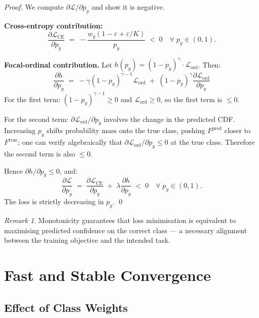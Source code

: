 \documentclass[12pt, a4paper]{article}
\theoremstyle{definition}
\theoremstyle{remark}
\newtheorem{remark}{Remark}
\begin{document}
\begin{proof}
We compute $\partial \mathcal{L}/\partial p_y$ and show it is negative.

\textbf{Cross-entropy contribution:}
\[
    \frac{\partial \mathcal{L}_{\mathrm{CE}}}{\partial p_y}
    \;=\; -\frac{w_y(1-\varepsilon+\varepsilon/K)}{p_y} \;<\; 0
    \quad \forall\; p_y \in (0,1).
\]

\textbf{Focal-ordinal contribution.}
Let $h(p_y) = (1-p_y)^\gamma \cdot \mathcal{L}_{\mathrm{ord}}$. Then:
\[
    \frac{\partial h}{\partial p_y}
    \;=\;
    -\gamma(1-p_y)^{\gamma-1}\mathcal{L}_{\mathrm{ord}}
    \;+\;
    (1-p_y)^\gamma \frac{\partial \mathcal{L}_{\mathrm{ord}}}{\partial p_y}
\]
For the first term: $(1-p_y)^{\gamma-1} \geq 0$ and $\mathcal{L}_{\mathrm{ord}} \geq 0$,
so the first term is $\leq 0$.

For the second term: $\partial \mathcal{L}_{\mathrm{ord}}/\partial p_y$
involves the change in the predicted CDF. Increasing $p_y$ shifts
probability mass onto the true class, pushing $F^{\mathrm{pred}}$ closer
to $F^{\mathrm{true}}$; one can verify algebraically that
$\partial \mathcal{L}_{\mathrm{ord}}/\partial p_y \leq 0$ at the true class.
Therefore the second term is also $\leq 0$.

Hence $\partial h/\partial p_y \leq 0$, and:
\[
    \frac{\partial \mathcal{L}}{\partial p_y}
    \;=\;
    \frac{\partial \mathcal{L}_{\mathrm{CE}}}{\partial p_y}
    \;+\;
    \lambda \frac{\partial h}{\partial p_y}
    \;<\; 0
    \quad \forall\; p_y \in (0,1).
\]
The loss is strictly decreasing in $p_y$. \qed
\end{proof}

\begin{remark}
Monotonicity guarantees that loss minimisation is equivalent to
maximising predicted confidence on the correct class — a necessary
alignment between the training objective and the intended task.
\end{remark}

\section{Fast and Stable Convergence}

\subsection{Effect of Class Weights}
\end{document}
